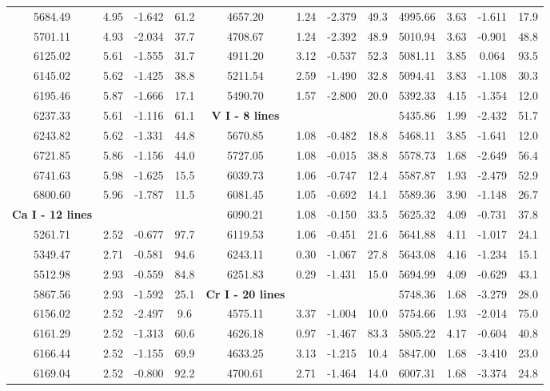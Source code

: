 \documentclass[dvips,12pt,a4paper]{report}
\begin{document}
{{\begin{table}[h]
\begin{tabular}{c c c c | c c c c | c c c c}
5684.49 & 4.95 & -1.642 &  61.2 & 4657.20 & 1.24 & -2.379 &  49.3 & 4995.66 & 3.63 & -1.611 &  17.9 \\
5701.11 & 4.93 & -2.034 &  37.7 & 4708.67 & 1.24 & -2.392 &  48.9 & 5010.94 & 3.63 & -0.901 &  48.8 \\
6125.02 & 5.61 & -1.555 &  31.7 & 4911.20 & 3.12 & -0.537 &  52.3 & 5081.11 & 3.85 &  0.064 &  93.5 \\
6145.02 & 5.62 & -1.425 &  38.8 & 5211.54 & 2.59 & -1.490 &  32.8 & 5094.41 & 3.83 & -1.108 &  30.3 \\
6195.46 & 5.87 & -1.666 &  17.1 & 5490.70 & 1.57 & -2.800 &  20.0 & 5392.33 & 4.15 & -1.354 &  12.0 \\
6237.33 & 5.61 & -1.116 &  61.1 & \textbf{V I - 8 lines}  & & & & 5435.86 & 1.99 & -2.432 &  51.7 \\
6243.82 & 5.62 & -1.331 &  44.8 & 5670.85 & 1.08 & -0.482 &  18.8 & 5468.11 & 3.85 & -1.641 &  12.0 \\
6721.85 & 5.86 & -1.156 &  44.0 & 5727.05 & 1.08 & -0.015 &  38.8 & 5578.73 & 1.68 & -2.649 &  56.4 \\
6741.63 & 5.98 & -1.625 &  15.5 & 6039.73 & 1.06 & -0.747 &  12.4 & 5587.87 & 1.93 & -2.479 &  52.9 \\
6800.60 & 5.96 & -1.787 &  11.5 & 6081.45 & 1.05 & -0.692 &  14.1 & 5589.36 & 3.90 & -1.148 &  26.7 \\
\textbf{Ca I - 12 lines} & & &  & 6090.21 & 1.08 & -0.150 &  33.5 & 5625.32 & 4.09 & -0.731 &  37.8 \\
5261.71 & 2.52 & -0.677 &  97.7 & 6119.53 & 1.06 & -0.451 &  21.6 & 5641.88 & 4.11 & -1.017 &  24.1 \\
5349.47 & 2.71 & -0.581 &  94.6 & 6243.11 & 0.30 & -1.067 &  27.8 & 5643.08 & 4.16 & -1.234 &  15.1 \\
5512.98 & 2.93 & -0.559 &  84.8 & 6251.83 & 0.29 & -1.431 &  15.0 & 5694.99 & 4.09 & -0.629 &  43.1 \\
5867.56 & 2.93 & -1.592 &  25.1 & \textbf{Cr I - 20 lines} & & &  & 5748.36 & 1.68 & -3.279 &  28.0 \\
6156.02 & 2.52 & -2.497 &   9.6 & 4575.11 & 3.37 & -1.004 &  10.0 & 5754.66 & 1.93 & -2.014 &  75.0 \\
6161.29 & 2.52 & -1.313 &  60.6 & 4626.18 & 0.97 & -1.467 &  83.3 & 5805.22 & 4.17 & -0.604 &  40.8 \\
6166.44 & 2.52 & -1.155 &  69.9 & 4633.25 & 3.13 & -1.215 &  10.4 & 5847.00 & 1.68 & -3.410 &  23.0 \\
6169.04 & 2.52 & -0.800 &  92.2 & 4700.61 & 2.71 & -1.464 &  14.0 & 6007.31 & 1.68 & -3.374 &  24.8 \\

\end{tabular}
\end{table}}}
\end{document}
